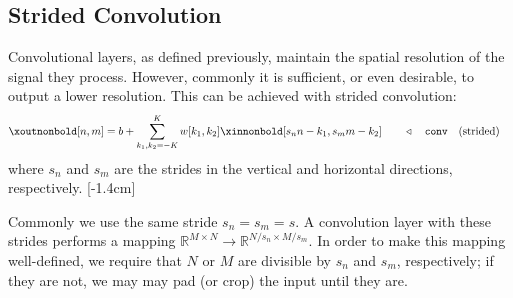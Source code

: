 \subsection{Strided Convolution}

Convolutional layers, as defined previously, maintain the spatial resolution of the signal they process. However, commonly it is sufficient, or even desirable, to output a lower resolution. This can be achieved with strided convolution:
\begin{align}
    \xoutnonbold[n,m] =
    b + \sum_{k_1,k_2=-K}^K w[k_1,k_2] \xinnonbold[s_n n-k_1,s_m m-k_2] & \quad\quad \triangleleft \quad \texttt{conv}\quad \text{(strided)}\label{eqn:convolutional_neural_nets:convolutional_filter_strided}
\end{align}
where $s_n$ and $s_m$ are the strides in the vertical and horizontal directions, respectively.
[-1.4cm]

Commonly we use the same stride $s_n = s_m = s$. A convolution layer with these strides performs a mapping $\mathbb{R}^{M \times N} \rightarrow \mathbb{R}^{N/s_n \times M/s_m}$. In order to make this mapping well-defined, we require that $N$ or $M$ are divisible by $s_n$ and $s_m$, respectively; if they are not, we may may pad (or crop) the input until they are.


